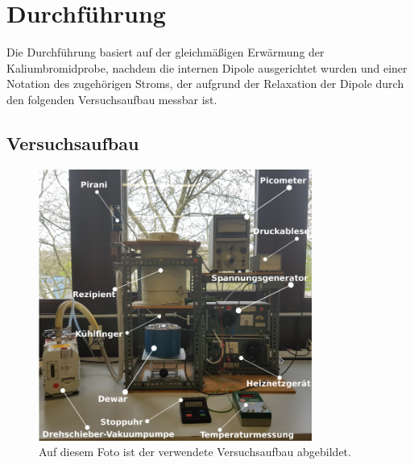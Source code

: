 \newpage

\section{Durchführung}
\label{sec:Durchführung}

Die Durchführung basiert auf der gleichmäßigen Erwärmung der Kaliumbromidprobe,
nachdem die internen Dipole ausgerichtet wurden und einer Notation des 
zugehörigen Stroms, der aufgrund der Relaxation der Dipole durch den folgenden 
Versuchsaufbau messbar ist.

\subsection{Versuchsaufbau}

\begin{figure}
    \centering
    \includegraphics[width=0.8\textwidth, keepaspectratio]{figure/AufbauFoto.png}
    \caption{Auf diesem Foto ist der verwendete Versuchsaufbau abgebildet. 
    \cite{sample}}
    \label{abb1}
\end{figure}


